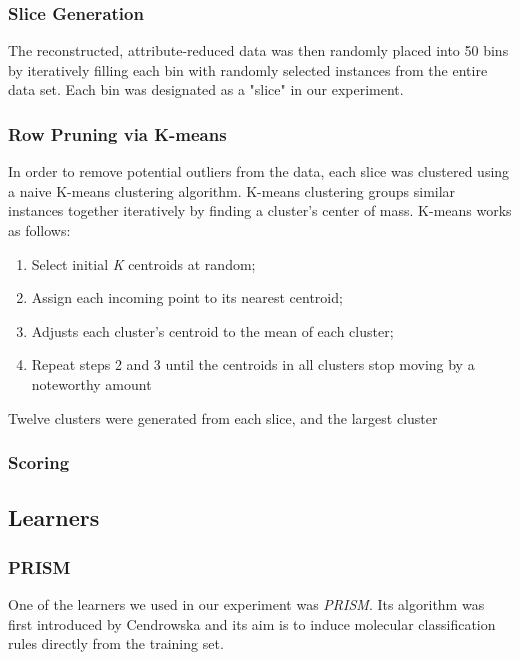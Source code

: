 \documentclass{sig-alternate}
\begin{document}
\subsubsection{Slice Generation}

The reconstructed, attribute-reduced data was then randomly placed into 50 bins by iteratively filling each bin with randomly selected instances from the entire data set. Each bin was designated as a "slice" in our experiment.

\subsubsection{Row Pruning via K-means}

In order to remove potential outliers from the data, each slice was clustered using a naive K-means clustering algorithm. K-means clustering groups similar instances together iteratively by finding a cluster's center of mass. K-means works as follows:

\begin{centering}
\begin{enumerate}
\item{Select initial {\em K} centroids at random;}
\item{Assign each incoming point to its nearest centroid;}
\item{Adjusts each cluster's centroid to the mean of each cluster;}
\item{Repeat steps 2 and 3 until the centroids in all clusters stop moving by a noteworthy amount}
\end{enumerate}
\end{centering}

Twelve clusters were generated from each slice, and the largest cluster

\subsubsection{Scoring }
\subsection{Learners}
\subsubsection{PRISM}
One of the learners we used in our experiment was {\em PRISM}. Its algorithm was first introduced by Cendrowska and its aim is to induce molecular classification rules directly from the training set.
\end{document}
